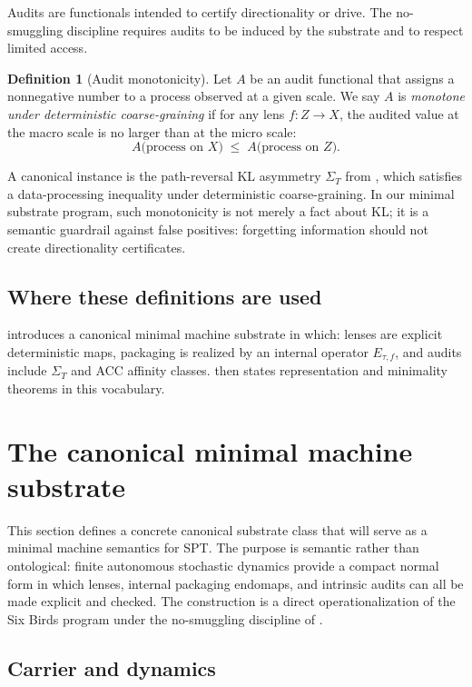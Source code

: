 \documentclass[11pt]{article}
\theoremstyle{definition}
\newtheorem{definition}[theorem]{Definition}
\theoremstyle{remark}
\begin{document}
Audits are functionals intended to certify directionality or drive.
The no-smuggling discipline requires audits to be induced by the substrate and to respect limited access.

\begin{definition}[Audit monotonicity]
\label{def:audit-mono}
Let $A$ be an audit functional that assigns a nonnegative number to a process observed at a given scale.
We say $A$ is \emph{monotone under deterministic coarse-graining} if for any lens $f:Z\to X$, the audited value at the macro scale is no larger than at the micro scale:
\[
A\big(\text{process on }X\big)\;\le\;A\big(\text{process on }Z\big).
\]
\end{definition}

A canonical instance is the path-reversal KL asymmetry $\Sigma_T$ from \citet{sixbirds2026}, which satisfies a data-processing inequality \citep{cover2006} under deterministic coarse-graining.
In our minimal substrate program, such monotonicity is not merely a fact about KL; it is a semantic guardrail against false positives: forgetting information should not create directionality certificates.

\subsection{Where these definitions are used}

 introduces a canonical minimal machine substrate in which:
lenses are explicit deterministic maps, packaging is realized by an internal operator $E_{\tau,f}$, and audits include $\Sigma_T$ and ACC affinity classes.
 then states representation and minimality theorems in this vocabulary.
 \section{The canonical minimal machine substrate}
\label{sec:machine}

This section defines a concrete canonical substrate class that will serve as a minimal machine semantics for SPT.
The purpose is semantic rather than ontological: finite autonomous stochastic dynamics provide a compact normal form in which lenses, internal packaging endomaps, and intrinsic audits can all be made explicit and checked.
The construction is a direct operationalization of the Six Birds program \citep{sixbirds2026} under the no-smuggling discipline of .

\subsection{Carrier and dynamics}
\end{document}
